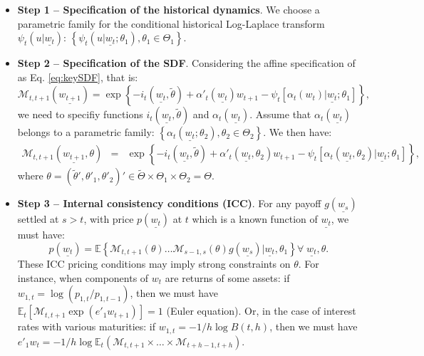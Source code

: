 \documentclass[
  12pt,
]{book}
\providecommand{\tightlist}{%
  \setlength{\itemsep}{0pt}\setlength{\parskip}{0pt}}
\theoremstyle{definition}
\theoremstyle{definition}
\theoremstyle{definition}
\theoremstyle{definition}
\theoremstyle{remark}
\begin{document}
\begin{itemize}
\tightlist
\item
  \textbf{Step 1 -- Specification of the historical dynamics}. We choose a parametric family for the conditional historical Log-Laplace transform \(\psi_t(u|\underline{w_t})\): \(\left\{ \psi_t (u|\underline{w_t} ; \theta_1), \theta_1 \in \Theta_1 \right\}\).
\item
  \textbf{Step 2 -- Specification of the SDF}. Considering the affine specification of as Eq. \eqref{eq:keySDF}, that is:
  \[
  \mathcal{M}_{t,t+1} (\underline{w_{t+1}}) = \exp\left\{ -i_{t}(\underline{w_t}, \tilde{\theta}) + \alpha'_t(\underline{w_t})w_{t+1} - \psi_t [\alpha_t (w_t)|\underline{w_t} ; \theta_1]\right\},
  \]
  we need to specifiy functions \(i_{t}(\underline{w_t}, \tilde{\theta})\) and \(\alpha_t(\underline{w_t})\). Assume that \(\alpha_t(\underline{w_t})\) belongs to a parametric family: \(\left\{ \alpha_t (\underline{w_t} ; \theta_2),\theta_2 \in \Theta_2 \right\}\).
  We then have:
  \begin{eqnarray*}
  \mathcal{M}_{t,t+1}(\underline{w_{t+1}}, \theta) &=& \exp \left\{ - i_{t}
  (\underline{w_t}, \tilde{\theta}) + \alpha'_t (\underline{w_t},\theta_2) w_{t+1} - \psi_{t} \left[ \alpha_t (\underline{w_t},
  \theta_2) | \underline{w_t} ; \theta_1 \right] \right\},
  \end{eqnarray*}
  where \(\theta = (\tilde{\theta}', \theta'_1,\theta'_2)' \in \tilde{\Theta}\times \Theta_1 \times \Theta_2 = \Theta\).
\item
  \textbf{Step 3 -- Internal consistency conditions (ICC)}. For any payoff \(g(\underline{w_s})\) settled at \(s>t\), with price \(p(\underline{w_t})\) at \(t\) which is a known function of
  \(\underline{w_t}\), we must have:
  \begin{equation*}
  p(\underline{w_t}) = \mathbb{E} \left\{\mathcal{M}_{t,t+1} (\theta) \dots \mathcal{M}_{s-1,s} (\theta) g(\underline{w_s})  |  \underline{w_t},
  \theta_1 \right\}    \forall \; \underline{w_t}, \theta.\label{eq:ICCgen}
  \end{equation*}
  These ICC pricing conditions may imply strong constraints on \(\theta\). For instance, when components of \(w_t\) are returns of some assets: if \(w_{1,t} = \log(p_{1,t}/p_{1,t-1})\), then we must have \(\mathbb{E}_t [\mathcal{M}_{t,t+1} \exp (e'_1 w_{t+1})]= 1\) (Euler equation). Or, in the case of interest rates with various maturities: if \(w_{1,t} = -1/h\log B(t,h)\), then we must have \(e'_1 w_{t} = - 1/h \log \mathbb{E}_t (\mathcal{M}_{t,t+1}\times \dots \times \mathcal{M}_{t+h-1,t+h})\).
\end{itemize}
\end{document}
